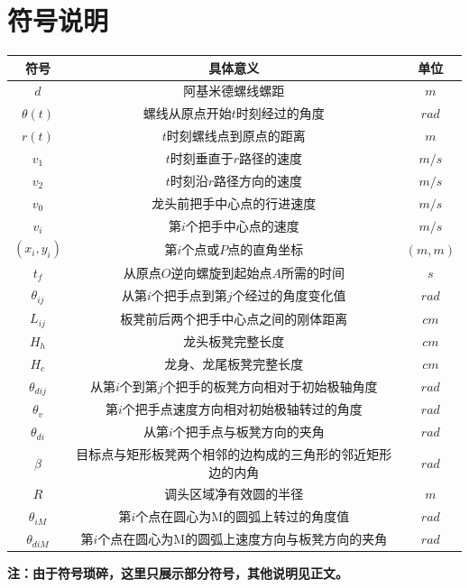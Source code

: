 \documentclass[withoutpreface,bwprint]{cumcmthesis} %
\begin{document}
\section{符号说明}
\begin{table}[!htbp]
    \centering
    \begin{tabular}{ccc}
        \toprule[2pt]
        \textbf{符号} & \textbf{具体意义} & \textbf{单位}\\
        \midrule[1pt]
        $d$ & 阿基米德螺线螺距 & $m$\\
        $\theta(t)$ & 螺线从原点开始$t$时刻经过的角度 & $rad$\\
        $r(t)$ &  $t$时刻螺线点到原点的距离 & $m$\\
        $v_1$ &   $t$时刻垂直于$r$路径的速度 & $m/s$\\
        $v_2$ &   $t$时刻沿$r$路径方向的速度 & $m/s$\\
        $v_0$ &  龙头前把手中心点的行进速度 & $m/s$\\
        $v_i$ &  第$i$个把手中心点的速度 & $m/s$\\
        $(x_i,y_i)$ &  第$i$个点或$P$点的直角坐标 & $(m,m)$\\
        $t_f$ & 从原点$O$逆向螺旋到起始点$A$所需的时间 & $s$\\
        $\theta_{ij}$ & 从第$i$个把手点到第$j$个经过的角度变化值 & $rad$\\
        $L_{ij}$ & 板凳前后两个把手中心点之间的刚体距离 & $cm$\\
        $H_h$ & 龙头板凳完整长度 & $cm$\\
        $H_e$ & 龙身、龙尾板凳完整长度 & $cm$\\
        $\theta_{dij}$ & 从第$i$个到第$j$个把手的板凳方向相对于初始极轴角度 &$rad$\\
        $\theta_{v}$ & 第$i$个把手点速度方向相对初始极轴转过的角度 &$rad$\\
        $\theta_{di}$ & 从第$i$个把手点与板凳方向的夹角 &$rad$\\
        $\beta$ & 目标点与矩形板凳两个相邻的边构成的三角形的邻近矩形边的内角 &$rad$\\
        $R$ & 调头区域净有效圆的半径 &$m$\\
        $\theta_{iM}$ & 第$i$个点在圆心为M的圆弧上转过的角度值 &$rad$\\
        $\theta_{diM}$ & 第$i$个点在圆心为M的圆弧上速度方向与板凳方向的夹角 &$rad$\\
        \bottomrule[2pt]
    \end{tabular}
\end{table}
\begin{center}
   \textbf{注：由于符号琐碎，这里只展示部分符号，其他说明见正文。} 
\end{center}
\end{document}
